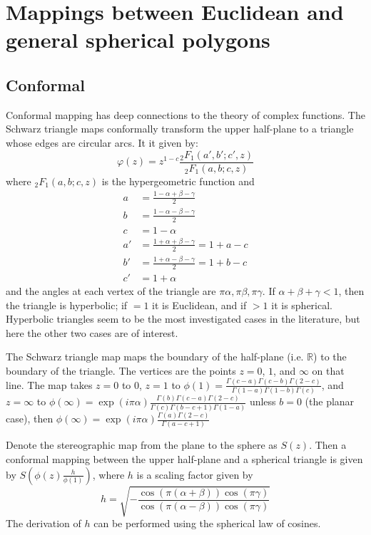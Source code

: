 \documentclass{amsart}[12pt]
\begin{document}
\section{Mappings between Euclidean and general spherical polygons}
\subsection{Conformal}
Conformal mapping has deep connections to the theory of complex functions.
The Schwarz triangle maps conformally transform the upper half-plane to a
triangle whose edges are circular arcs. It it given by:
\begin{equation}
   \varphi(z) = z^{1-c} \frac{_2 F_1(a',b';c',z)}{_2 F_1(a,b;c,z)}
\end{equation}
where $_2 F_1(a,b;c,z)$ is the hypergeometric function and
\begin{equation}\begin{split}
   a & = \frac{1 - \alpha + \beta - \gamma}{2}\\
   b & = \frac{1 - \alpha - \beta - \gamma}{2}\\
   c & = 1 - \alpha\\
   a' &= \frac{1 + \alpha + \beta - \gamma}{2} = 1 + a - c\\
   b' &= \frac{1 + \alpha - \beta - \gamma}{2} = 1 + b - c\\
   c' &= 1 + \alpha
\end{split}\end{equation}
and the angles at each vertex of the triangle are $\pi \alpha, \pi \beta,
\pi \gamma$. If $\alpha + \beta + \gamma < 1$, then the triangle is hyperbolic;
if $=1$ it is Euclidean, and if $>1$ it is spherical. \cite{nehari} Hyperbolic
triangles seem to be the most investigated cases in the literature, but here the
other two cases are of interest.

The Schwarz triangle map maps the boundary of the half-plane (i.e. $\mathbb{R}$)
to the boundary of the triangle. The vertices are the points $z=0$, $1$, and
$\infty$ on that line. The map takes $z=0$ to $0$, $z=1$ to $\phi(1) =
\frac{\Gamma(c-a) \Gamma(c-b) \Gamma(2-c)}{\Gamma(1-a) \Gamma(1-b) \Gamma(c)}$,
and $z=\infty$ to $\phi(\infty) = \exp\left(i \pi \alpha \right)
\frac{\Gamma(b) \Gamma(c-a) \Gamma(2-c)}{\Gamma(c) \Gamma(b-c+1) \Gamma(1-a)}$
unless $b=0$ (the planar case), then $\phi(\infty) = \exp\left(i \pi \alpha \right)
\frac{\Gamma(a) \Gamma(2-c)}{\Gamma(a-c+1)}$

Denote the stereographic map from the plane to the sphere as $S(z)$. Then a
conformal mapping between the upper half-plane and a spherical triangle is
given by $S\left(\phi(z)\frac{h}{\phi(1)}\right)$, where $h$ is a scaling factor
given by
\begin{equation}
  h = \sqrt{ -\frac{\cos \left(\pi (\alpha+\beta)\right)
                    \cos\left(\pi\gamma\right)}
                   {\cos \left(\pi (\alpha-\beta)\right)
                    \cos\left(\pi\gamma\right)}}
\end{equation}
The derivation of $h$ can be performed using the spherical law of cosines.
\end{document}
